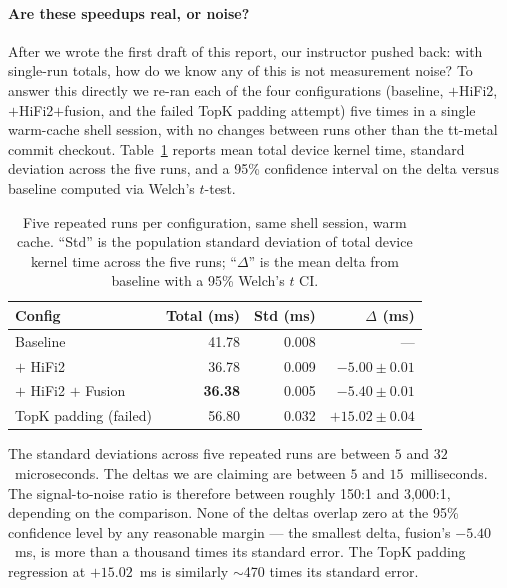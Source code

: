 \documentclass[sigplan,nonacm]{acmart}
\begin{document}
\paragraph{Are these speedups real, or noise?}
\label{sec:variance}
After we wrote the first draft of this report, our instructor
pushed back: with single-run totals, how do we know any of this is
not measurement noise? To answer this directly we re-ran each of the
four configurations (baseline, $+$HiFi2, $+$HiFi2$+$fusion, and the
failed TopK padding attempt) five times in a single warm-cache shell
session, with no changes between runs other than the tt-metal commit
checkout. Table~\ref{tab:variance} reports mean total device kernel
time, standard deviation across the five runs, and a 95\% confidence
interval on the delta versus baseline computed via Welch's
$t$-test.

\begin{table}[h]
\centering
\small
\setlength{\tabcolsep}{4pt}
\caption{Five repeated runs per configuration, same shell session,
warm cache. ``Std'' is the population standard deviation of total
device kernel time across the five runs; ``$\Delta$'' is the mean
delta from baseline with a 95\% Welch's $t$ CI.}
\label{tab:variance}
\begin{tabular}{lrrr}
\toprule
Config & Total (ms) & Std (ms) & $\Delta$ (ms) \\
\midrule
Baseline                  & 41.78 & 0.008 & --- \\
$+$ HiFi2                 & 36.78 & 0.009 & ${-}5.00 \pm 0.01$ \\
$+$ HiFi2 $+$ Fusion      & \textbf{36.38} & 0.005 & $\mathbf{{-}5.40 \pm 0.01}$ \\
\midrule
TopK padding (failed)     & 56.80 & 0.032 & $+15.02 \pm 0.04$ \\
\bottomrule
\end{tabular}
\end{table}

The standard deviations across five repeated runs are between
$5$ and $32$~microseconds. The deltas we are claiming are
between $5$ and $15$~milliseconds. The signal-to-noise ratio
is therefore between roughly 150:1 and 3{,}000:1, depending on the
comparison. None of the deltas overlap zero at the 95\% confidence
level by any reasonable margin --- the smallest delta, fusion's
${-}5.40$~ms, is more than a thousand times its standard error. The
TopK padding regression at $+15.02$~ms is similarly $\sim$470 times
its standard error.
\end{document}
